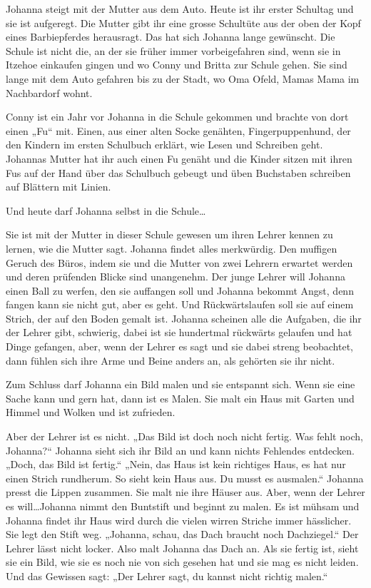 Johanna steigt mit der Mutter aus dem Auto. Heute ist ihr erster Schultag und sie ist aufgeregt. Die Mutter gibt ihr eine grosse Schultüte aus der oben der Kopf eines Barbiepferdes herausragt. Das hat sich Johanna lange gewünscht. Die Schule ist nicht die, an der sie früher immer vorbeigefahren sind, wenn sie in Itzehoe einkaufen gingen und wo Conny und Britta zur Schule gehen. Sie sind lange mit dem Auto gefahren bis zu der Stadt, wo Oma Ofeld, Mamas Mama im Nachbardorf wohnt.

Conny ist ein Jahr vor Johanna in die Schule gekommen und brachte von dort einen „Fu“ mit. Einen, aus einer alten Socke genähten, Fingerpuppenhund, der den Kindern im ersten Schulbuch erklärt, wie Lesen und Schreiben geht. Johannas Mutter hat ihr auch einen Fu genäht und die Kinder sitzen mit ihren Fus auf der Hand über das Schulbuch gebeugt und üben Buchstaben schreiben auf Blättern mit Linien.

Und heute darf Johanna selbst in die Schule\dots

Sie ist mit der Mutter in dieser Schule gewesen um ihren Lehrer kennen zu lernen, wie die Mutter sagt. Johanna findet alles merkwürdig. Den muffigen Geruch des Büros, indem sie und die Mutter von zwei Lehrern erwartet werden und deren prüfenden Blicke sind unangenehm. Der junge Lehrer will Johanna einen Ball zu werfen, den sie auffangen soll und Johanna bekommt Angst, denn fangen kann sie nicht gut, aber es geht. Und Rückwärtslaufen soll sie auf einem Strich, der auf den Boden gemalt ist. Johanna scheinen alle die Aufgaben, die ihr der Lehrer gibt, schwierig, dabei ist sie hundertmal rückwärts gelaufen und hat Dinge gefangen, aber, wenn der Lehrer es sagt und sie dabei streng beobachtet, dann fühlen sich ihre Arme und Beine anders an, als gehörten sie ihr nicht.

Zum Schluss darf Johanna ein Bild malen und sie entspannt sich. Wenn sie eine Sache kann und gern hat, dann ist es Malen. Sie malt ein Haus mit Garten und Himmel und Wolken und ist zufrieden. 

Aber der Lehrer ist es nicht. „Das Bild ist doch noch nicht fertig. Was fehlt noch, Johanna?“  Johanna sieht sich ihr Bild an und kann nichts Fehlendes entdecken. „Doch, das Bild ist fertig.“ „Nein, das Haus ist kein richtiges Haus, es hat nur einen Strich rundherum. So sieht kein Haus aus. Du musst es ausmalen.“ Johanna presst die Lippen zusammen. Sie malt nie ihre Häuser aus. Aber, wenn der Lehrer es will\dots Johanna nimmt den Buntstift und beginnt zu malen. Es ist mühsam und Johanna findet ihr Haus wird durch die vielen wirren Striche immer hässlicher. Sie legt den Stift weg. „Johanna, schau, das Dach braucht noch Dachziegel.“ Der Lehrer lässt nicht locker. Also malt Johanna das Dach an. Als sie fertig ist, sieht sie ein Bild, wie sie es noch nie von sich gesehen hat und sie mag es nicht leiden. Und das Gewissen sagt: „Der Lehrer sagt, du kannst nicht richtig malen.“


